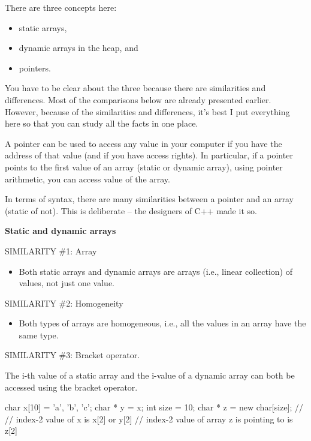 \newpage{}

There are three concepts here:

\begin{itemize}
\item static arrays,
\item dynamic arrays in the heap, and
\item pointers.
\end{itemize}

You have to be clear about the three because there are similarities and
differences. Most of the comparisons below are already presented
earlier. However, because of the similarities and differences, it's best
I put everything here so that you can study all the facts in one place.

A pointer can be used to access any value in your computer if you have
the address of that value (and if you have access rights). In
particular, if a pointer points to the first value of an array (static
or dynamic array), using pointer arithmetic, you can access value of the
array.

In terms of syntax, there are many similarities between a pointer and an
array (static of not). This is deliberate -- the designers of C++ made
it so.

\textbf{Static and dynamic arrays}

SIMILARITY \#1: Array

\begin{itemize}
\item Both static arrays and dynamic arrays are arrays (i.e., linear
  collection) of values, not just one value.
\end{itemize}

SIMILARITY \#2: Homogeneity

\begin{itemize}
\item Both types of arrays are homogeneous, i.e., all the values in an array
  have the same type.
\end{itemize}

SIMILARITY \#3: Bracket operator.

The i-th value of a static array and the i-value of a dynamic array can
both be accessed using the bracket operator.

\begin{consolethree}[escapeinside=||]
char x[10] = {'a', 'b', 'c'};
char * y = x;
int size = 10;
char * z = new char[size];
//
// index-2 value of x is x[2] or y[2]
// index-2 value of array z is pointing to is z[2]
\end{consolethree}

